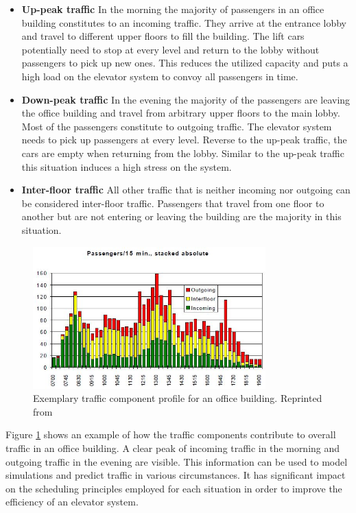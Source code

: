 \begin{itemize}
    \item \textbf{Up-peak traffic} In the morning the majority of passengers in an office building constitutes to an incoming traffic.
    They arrive at the entrance lobby and travel to different upper floors to fill the building.
    The lift cars potentially need to stop at every level and return to the lobby without passengers to pick up new ones. 
    This reduces the utilized capacity and puts a high load on the elevator system to convoy all passengers in time.
    \item \textbf{Down-peak traffic} In the evening the majority of the passengers are leaving the office building and travel from arbitrary upper floors to the main lobby.
    Most of the passengers constitute to outgoing traffic.
    The elevator system needs to pick up passengers at every level. 
    Reverse to the up-peak traffic, the cars are empty when returning from the lobby.
    Similar to the up-peak traffic this situation induces a high stress on the system.
    \item \textbf{Inter-floor traffic} All other traffic that is neither incoming nor outgoing can be considered inter-floor traffic. Passengers that travel from one floor to another but are not entering or leaving the building are the majority in this situation.
\end{itemize}

\begin{figure}[hbt]
	\centering
	\includegraphics[width=0.8\textwidth, keepaspectratio]{resources/traffictimes}
	\caption[Exemplary traffic component profile for an office building]{\label{fig:sota:traffictimes} Exemplary traffic component profile for an office building.
	Reprinted from \textcite[][p.~14]{siikonen1997models}}
\end{figure}

Figure \ref{fig:sota:traffictimes} shows an example of how the traffic components contribute to overall traffic in an office building. A clear peak of incoming traffic in the morning and outgoing traffic in the evening are visible.
This information can be used to model simulations and predict traffic in various circumstances.
It has significant impact on the scheduling principles employed for each situation in order to improve the efficiency of an elevator system.

